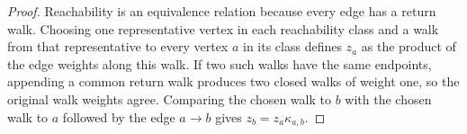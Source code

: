 \begin{proof}
    \leanok
    Reachability is an equivalence relation because every edge has a return
    walk. Choosing one representative vertex in each reachability class and a
    walk from that representative to every vertex $a$ in its class defines
    $z_a$ as the product of the edge weights along this walk. If two such walks
    have the same endpoints, appending a common return walk produces two closed
    walks of weight one, so the original walk weights agree. Comparing the
    chosen walk to $b$ with the chosen walk to $a$ followed by the edge
    $a\to b$ gives $z_b=z_a\kappa_{a,b}$.
\end{proof}
